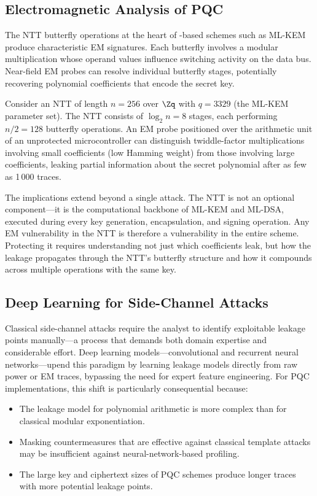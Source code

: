 \subsection{Electromagnetic Analysis of PQC}
\label{subsec:em-analysis}

The NTT butterfly operations at the heart of \mlwe{}-based schemes such as ML-KEM produce characteristic EM signatures.  Each butterfly involves a modular multiplication whose operand values influence switching activity on the data bus.  Near-field EM probes can resolve individual butterfly stages, potentially recovering polynomial coefficients that encode the secret key.

\begin{example}
\label{ex:em-ntt}
Consider an NTT of length $n = 256$ over $\Zq$ with $q = 3329$ (the ML-KEM parameter set).  The NTT consists of $\log_2 n = 8$ stages, each performing $n/2 = 128$ butterfly operations.  An EM probe positioned over the arithmetic unit of an unprotected microcontroller can distinguish twiddle-factor multiplications involving small coefficients (low Hamming weight) from those involving large coefficients, leaking partial information about the secret polynomial after as few as 1\,000 traces.
\end{example}

The implications extend beyond a single attack.  The NTT is not an optional component---it is the computational backbone of ML-KEM and ML-DSA, executed during every key generation, encapsulation, and signing operation.  Any EM vulnerability in the NTT is therefore a vulnerability in the entire scheme.  Protecting it requires understanding not just which coefficients leak, but how the leakage propagates through the NTT's butterfly structure and how it compounds across multiple operations with the same key.

\subsection{Deep Learning for Side-Channel Attacks}
\label{subsec:deep-learning-sca}

Classical side-channel attacks require the analyst to identify exploitable leakage points manually---a process that demands both domain expertise and considerable effort.  Deep learning models---convolutional and recurrent neural networks---upend this paradigm by learning leakage models directly from raw power or EM traces, bypassing the need for expert feature engineering.  For PQC implementations, this shift is particularly consequential because:
\begin{itemize}
\item The leakage model for polynomial arithmetic is more complex than for classical modular exponentiation.
\item Masking countermeasures that are effective against classical template attacks may be insufficient against neural-network-based profiling.
\item The large key and ciphertext sizes of PQC schemes produce longer traces with more potential leakage points.
\end{itemize}

